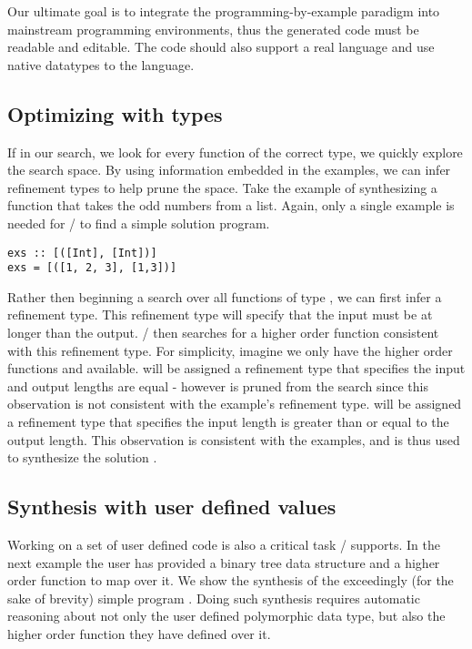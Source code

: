 Our ultimate goal is to integrate the programming-by-example paradigm 
into mainstream programming environments, thus the generated code must be readable and editable.
The code should also support a real language and use native datatypes to the language.


\subsection{Optimizing with types}

If in our search, we look for every function of the correct type, we quickly explore the search space.
By using information embedded in the examples, we can infer refinement types to help prune the space.
Take the example of synthesizing a function that takes the odd numbers from a list.
Again, only a single example is needed for \ourTool/ to find a simple solution program.

\begin{lstlisting}
exs :: [([Int], [Int])]
exs = [([1, 2, 3], [1,3])]
\end{lstlisting}

Rather then beginning a search over all functions of type \codeinline{[Int] -> [Int]}, we can first infer a refinement type.
This refinement type will specify that the input must be at longer than the output.
\ourTool/ then searches for a higher order function consistent with this refinement type.
For simplicity, imagine we only have the higher order functions  and  available.
 will be assigned a refinement type that specifies the input and output lengths are equal - however is pruned from the search since this observation is not consistent with the example's refinement type.
 will be assigned a refinement type that specifies the input length is greater than or equal to the output length.
This observation is consistent with the examples, and is thus used to synthesize the solution .


\subsection{Synthesis with user defined values}

Working on a set of user defined code is also a critical task \ourTool/ supports. 
In the next example the user has provided a binary tree data structure and a higher order function to map over it. We show the synthesis of the exceedingly (for the sake of brevity) simple program .
Doing such synthesis requires automatic reasoning about not only the user defined polymorphic data type, but also the higher order function they have defined over it.

